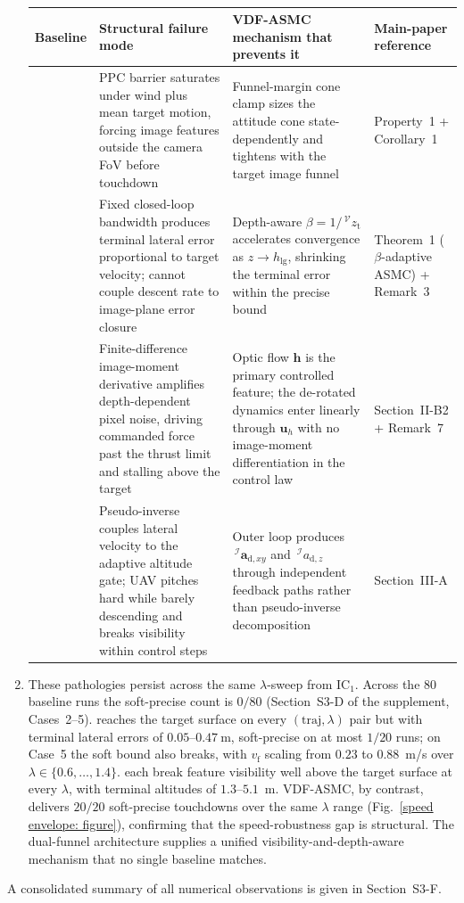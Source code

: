 \begin{enumerate}
\begin{table}[!t]
\centering
\caption{}
\label{mechanism contrast: table}
\footnotesize
\setlength{\tabcolsep}{4pt}
\begin{tabular}{p{} p{} p{} p{}}
\toprule
\textbf{Baseline} & \textbf{Structural failure mode} & \textbf{VDF-ASMC mechanism that prevents it} & \textbf{Main-paper reference} \\
\midrule
\cite{lin2022} & PPC barrier saturates under wind plus mean target motion, forcing image features outside the camera FoV before touchdown & Funnel-margin cone clamp sizes the attitude cone state-dependently and tightens with the target image funnel & Property~1 + Corollary~1 \\
\cite{zhang2026} & Fixed closed-loop bandwidth produces terminal lateral error proportional to target velocity; cannot couple descent rate to image-plane error closure & Depth-aware $\beta=1/\,^\mathcal{V}z_\text{t}$ accelerates convergence as $z\to h_\text{lg}$, shrinking the terminal error within the precise bound & Theorem~1 ($\beta$-adaptive ASMC) + Remark~3 \\
\cite{chen2025} & Finite-difference image-moment derivative amplifies depth-dependent pixel noise, driving commanded force past the thrust limit and stalling above the target & Optic flow $\boldsymbol{h}$ is the primary controlled feature; the de-rotated dynamics enter linearly through $\boldsymbol{u}_h$ with no image-moment differentiation in the control law & Section~II-B2 + Remark~7 \\
\cite{cho2022} & Pseudo-inverse couples lateral velocity to the adaptive altitude gate; UAV pitches hard while barely descending and breaks visibility within control steps & Outer loop produces $\,^\mathcal{I}\boldsymbol{a}_{\text{d},xy}$ and $\,^\mathcal{I}a_{\text{d},z}$ through independent feedback paths rather than pseudo-inverse decomposition & Section~III-A \\
\bottomrule
\end{tabular}
\end{table}
    \item These pathologies persist across the same $\lambda$-sweep from IC$_1$. Across the $80$ baseline runs the soft-precise count is $0/80$ (Section~S3-D of the supplement, Cases~2--5). \cite{zhang2026} reaches the target surface on every $(\text{traj},\lambda)$ pair but with terminal lateral errors of $0.05$--$0.47~\text{m}$, soft-precise on at most $1/20$ runs; on Case~5 the soft bound also breaks, with $v_\text{f}$ scaling from $0.23$ to $0.88$~m/s over $\lambda\in\{0.6,\ldots,1.4\}$. \cite{lin2022,chen2025,cho2022} each break feature visibility well above the target surface at every $\lambda$, with terminal altitudes of $1.3$--$5.1$~m. VDF-ASMC, by contrast, delivers $20/20$ soft-precise touchdowns over the same $\lambda$ range (Fig.~\ref{speed envelope: figure}), confirming that the speed-robustness gap is structural. The dual-funnel architecture supplies a unified visibility-and-depth-aware mechanism that no single baseline matches.
\end{enumerate}

A consolidated summary of all numerical observations is given in Section~S3-F.
